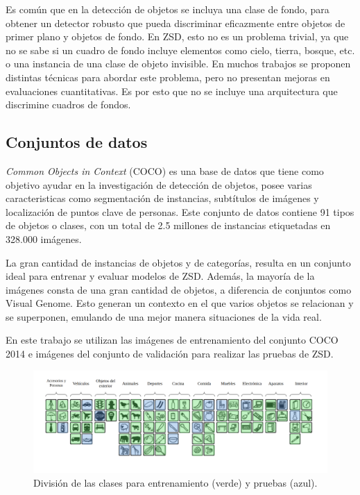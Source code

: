 Es común que en la detección de objetos se incluya una clase de fondo, para obtener un detector robusto que pueda discriminar eficazmente entre objetos de primer plano y objetos de fondo. En ZSD, esto no es un problema trivial, ya que no se sabe si un cuadro de fondo incluye elementos como cielo, tierra, bosque, etc. o una instancia de una clase de objeto invisible. En muchos trabajos se proponen distintas técnicas para abordar este problema, pero no presentan mejoras en evaluaciones cuantitativas. Es por esto que no se incluye una arquitectura que discrimine cuadros de fondos.

\subsection{Conjuntos de datos} \label{ssec:conjuntosdedatos}
\textit{Common Objects in Context} (COCO) es una base de datos que tiene como objetivo ayudar en la investigación de detección de objetos, posee varias caracteristicas como segmentación de instancias, subtítulos de imágenes y localización de puntos clave de personas. Este conjunto de datos contiene 91 tipos de objetos o  clases, con un total de 2.5 millones de instancias etiquetadas en 328.000 imágenes.

La gran cantidad de instancias de objetos y de categorías, resulta en un conjunto ideal para entrenar y evaluar modelos de ZSD. Además, la mayoría de la imágenes consta de una gran cantidad de objetos, a diferencia de conjuntos como Visual Genome. Esto generan un contexto en el que varios objetos se relacionan y se superponen, emulando de una mejor manera situaciones de la vida real. 

En este trabajo se utilizan las imágenes de entrenamiento del conjunto COCO 2014 e imágenes del conjunto de validación para realizar las pruebas de ZSD.
\begin{figure}
	\begin{center}
		\centering
		\includegraphics[width=1\textwidth]{img/data_set.png}
		\caption{División de las clases para entrenamiento (verde) y pruebas (azul).}
		\label{fig:data_set}
	\end{center}	
\end{figure}

